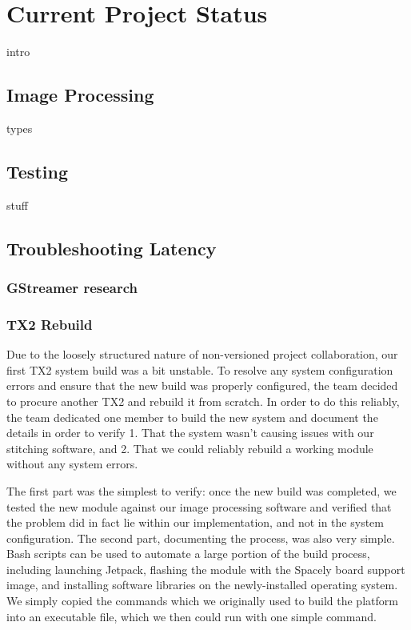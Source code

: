 \documentclass[letterpaper,10pt,serif,draftclsnofoot,onecolumn,compsoc,titlepage]{IEEEtran}
\begin{document}
\section{Current Project Status}

intro\\

\subsection{Image Processing}

types\\

\subsection{Testing}

stuff\\

\subsection{Troubleshooting Latency}

\subsubsection{GStreamer research}

\subsubsection{TX2 Rebuild}
Due to the loosely structured nature of non-versioned project collaboration, our first TX2 system build was a bit unstable. To resolve any system configuration errors and ensure that the new build was properly configured, the team decided to procure another TX2 and rebuild it from scratch. In order to do this reliably, the team dedicated one member to build the new system and document the details in order to verify 1. That the system wasn't causing issues with our stitching software, and 2. That we could reliably rebuild a working module without any system errors.

The first part was the simplest to verify: once the new build was completed, we tested the new module against our image processing software and verified that the problem did in fact lie within our implementation, and not in the system configuration. The second part, documenting the process, was also very simple. Bash scripts can be used to automate a large portion of the build process, including launching Jetpack, flashing the module with the Spacely board support image, and installing software libraries on the newly-installed operating system. We simply copied the commands which we originally used to build the platform into an executable file, which we then could run with one simple command.
\end{document}
